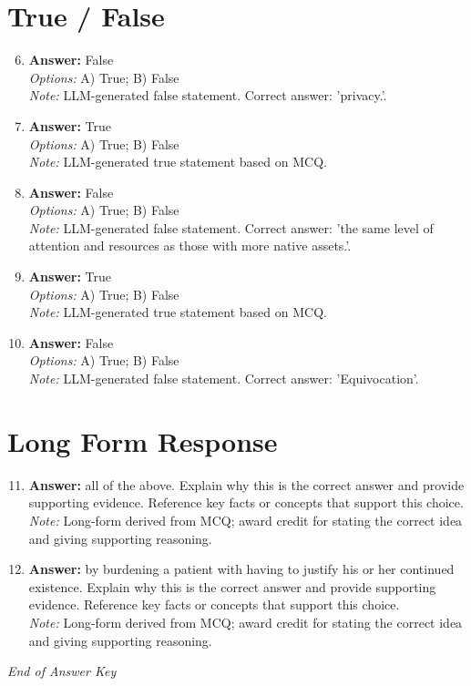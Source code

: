 \documentclass[12pt]{article}
\begin{document}
\section*{True / False}
\begin{enumerate}[label=\arabic*.]
\setcounter{enumi}{5}
\item \textbf{Answer:} False
\\ \textit{Options:} A) True; B) False
\\ \textit{Note:} LLM-generated false statement. Correct answer: 'privacy.'.
\item \textbf{Answer:} True
\\ \textit{Options:} A) True; B) False
\\ \textit{Note:} LLM-generated true statement based on MCQ.
\item \textbf{Answer:} False
\\ \textit{Options:} A) True; B) False
\\ \textit{Note:} LLM-generated false statement. Correct answer: 'the same level of attention and resources as those with more native assets.'.
\item \textbf{Answer:} True
\\ \textit{Options:} A) True; B) False
\\ \textit{Note:} LLM-generated true statement based on MCQ.
\item \textbf{Answer:} False
\\ \textit{Options:} A) True; B) False
\\ \textit{Note:} LLM-generated false statement. Correct answer: 'Equivocation'.
\end{enumerate}

\section*{Long Form Response}
\begin{enumerate}[label=\arabic*.]
\setcounter{enumi}{10}
\item \textbf{Answer:} all of the above. Explain why this is the correct answer and provide supporting evidence. Reference key facts or concepts that support this choice.
\\ \textit{Note:} Long-form derived from MCQ; award credit for stating the correct idea and giving supporting reasoning.
\item \textbf{Answer:} by burdening a patient with having to justify his or her continued existence. Explain why this is the correct answer and provide supporting evidence. Reference key facts or concepts that support this choice.
\\ \textit{Note:} Long-form derived from MCQ; award credit for stating the correct idea and giving supporting reasoning.
\end{enumerate}

\vfill
\noindent\textit{End of Answer Key}
\end{document}
